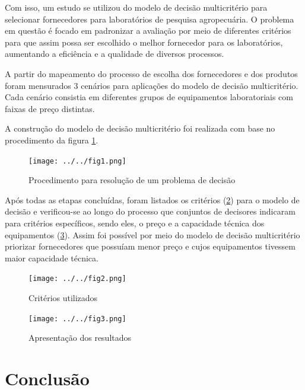 \documentclass[
	12pt,				%
	openright,			%
	oneside,			%
	a4paper,			%
	english,			%
	french,				%
	spanish,			%
	brazil				%
	]{abntex2}
\begin{document}
Com isso, um estudo se utilizou do modelo de decisão multicritério para selecionar fornecedores para laboratórios de pesquisa agropecuária. O problema em questão é focado em padronizar a avaliação por meio de diferentes critérios para que assim possa ser escolhido o melhor fornecedor para os laboratórios, aumentando a eficiência e a qualidade de diversos processos. \cite{tcc}

A partir do mapeamento do processo de escolha dos fornecedores e dos produtos foram mensurados 3 cenários para aplicações do modelo de decisão multicritério. Cada cenário consistia em diferentes grupos de equipamentos laboratoriais com faixas de preço distintas. \cite{tcc}

A construção do modelo de decisão multicritério foi realizada com base no procedimento da figura \ref{fig1}.

\begin{figure}[H] \centering 
\caption{Procedimento para resolução de um problema de decisão}
\texttt{[image: ../../fig1.png]}
\label{fig1}
\end{figure}

Após todas as etapas concluídas, foram listados os critérios (\ref{fig2}) para o modelo de decisão e verificou-se ao longo do processo que conjuntos de decisores indicaram para critérios específicos, sendo eles, o preço e a capacidade técnica dos equipamentos (\ref{fig3}). Assim foi possível por meio do modelo de decisão multicritério priorizar fornecedores que possuíam menor preço e cujos equipamentos tivessem maior capacidade técnica.

\begin{figure}[H] \centering 
\caption{Critérios utilizados}
\texttt{[image: ../../fig2.png]}
\label{fig2}
\end{figure}

\begin{figure}[H] \centering 
\caption{Apresentação dos resultados}
\texttt{[image: ../../fig3.png]}
\label{fig3}
\end{figure}




\chapter*{Conclusão}
\end{document}
